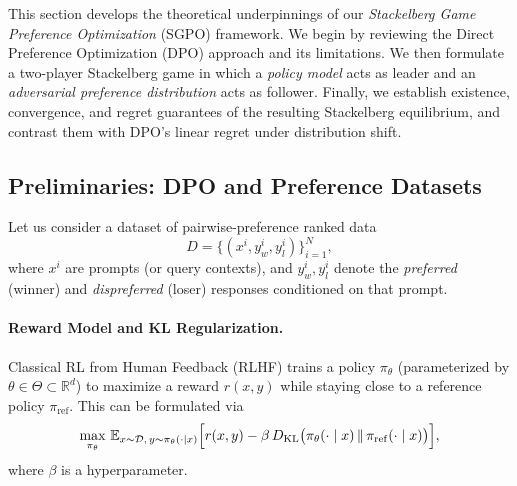 This section develops the theoretical underpinnings of our \emph{Stackelberg Game Preference Optimization} (SGPO) framework. We begin by reviewing the Direct Preference Optimization (DPO) approach and its limitations. We then formulate a two-player Stackelberg game in which a \emph{policy model} acts as leader and an \emph{adversarial preference distribution} acts as follower. Finally, we establish existence, convergence, and regret guarantees of the resulting Stackelberg equilibrium, and contrast them with DPO’s linear regret under distribution shift.

\subsection{Preliminaries: DPO and Preference Datasets}

Let us consider a dataset of pairwise-preference ranked data 
\[
D = \{(x^i, y^i_{w}, y^i_{l})\}_{i=1}^N,
\]
where \(x^i\) are prompts (or query contexts), and \(y^i_{w}, y^i_{l}\) denote the \emph{preferred} (winner) and \emph{dispreferred} (loser) responses conditioned on that prompt.

\paragraph{Reward Model and KL Regularization.}  
Classical RL from Human Feedback (RLHF) \citep{Christiano2017DeepRLHF} trains a policy \(\pi_\theta\) (parameterized by \(\theta \in \Theta\subset\mathbb{R}^d\)) to maximize a reward \(r(x,y)\) while staying close to a reference policy \(\pi_{\mathrm{ref}}\).  This can be formulated via
\begin{equation}
\label{eq:rlhf_obj}
\max_{\pi_\theta} \, \mathbb{E}_{x \sim \mathcal{D},\, y \sim \pi_\theta(\cdot \mid x)}
\Bigl[r(x,y) - \beta \, D_{\mathrm{KL}}\bigl(\pi_\theta(\cdot\mid x)\,\Vert\,\pi_{\mathrm{ref}}(\cdot\mid x)\bigr)\Bigr],
\end{equation}
where \(\beta\) is a hyperparameter. 

